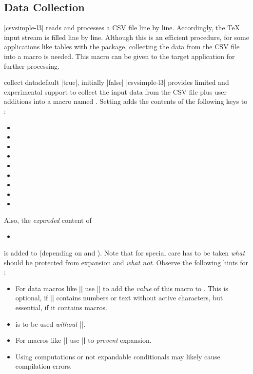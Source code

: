 \documentclass[a4paper,11pt]{ltxdoc}
\begin{document}
\clearpage
\subsection{Data Collection}\label{sec:datacollection}

|csvsimple-l3| reads and processes a CSV file line by line. Accordingly, the \TeX{}
input stream is filled line by line.
Although this is an efficient procedure, for some applications like tables with
the  package, collecting the data from the CSV file into a macro is needed.
This macro can be given to the target application for further processing.


\begin{docCsvKey}[][doc new and updated={2021-07-06}{2023-10-17}]{collect data}{}{default |true|, initially |false|}
|csvsimple-l3| provides limited and experimental support to collect the input data
from the CSV file plus user additions into a macro named .
Setting  adds the contents of the following keys
to :
\begin{itemize}
\item{}
\item{}
\item{}
\item{}
\item{}
\item{}
\item{}
\item{}
\item{}
\end{itemize}
Also, the \emph{expanded} content of
\begin{itemize}
\item{}
\end{itemize}
is added to 
(depending on  and ).
Note that for  special care has to be taken
\emph{what} should be protected from expansion and \emph{what not}.
Observe the following hints for :
\begin{itemize}
\item For data macros like |\csvcoli| use |\csvexpval\csvcoli| to add
  the \emph{value} of this macro to .
  This is optional, if |\csvcoli| contains numbers or text without active
  characters, but essential, if it contains macros.
\item {} is to be used \emph{without} |\csvexpval|.
\item For macros like |\textbf| use  |\csvexpnot\textbf| to \emph{prevent}
  expansion.
\item Using computations or not expandable conditionals may likely cause
  compilation errors.
\end{itemize}


\end{docCsvKey}
\end{document}
